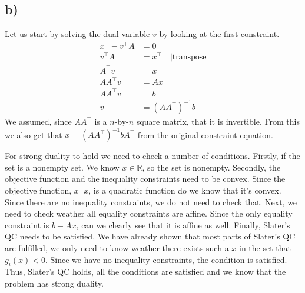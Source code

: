 \documentclass{article}
\begin{document}
\subsection*{b)}
	Let us start by solving the dual variable $v$ by looking at the first constraint.
	\begin{align}
		x^\top - v^\top A &= 0\\
		v^\top A &= x^\top \quad|\text{transpose}\\
		A^\top v &= x\\
		AA^\top v &= Ax\\
		AA^\top v &= b\\
		v &= (AA^\top)^{-1}b
	\end{align}
	We assumed, since $AA^\top$ is a $n$-by-$n$ square matrix, that it is invertible. From this we also get that $x=(AA^\top)^{-1}b A^\top$ from the original constraint equation. 
	
	For strong duality to hold we need to check a number of conditions. Firstly, if the set is a nonempty set. We know $x \in \mathbb{R}$, so the set is nonempty. Secondly, the objective function and the inequality constraints need to be convex. Since the objective function, $x^\top x$, is a quadratic function do we know that it's convex. Since there are no inequality constraints, we do not need to check that. Next, we need to check weather all equality constraints are affine. Since the only equality constraint is $b-Ax$, can we clearly see that it is affine as well. Finally, Slater's QC needs to be satisfied. We have already shown that most parts of Slater's QC are fulfilled, we only need to know weather there exists such a $x$ in the set that $g_i(x) < 0$. Since we have no inequality constraints, the condition is satisfied. Thus, Slater's QC holds, all the  conditions are satisfied and we know that the problem has strong duality.
	
\end{document}
